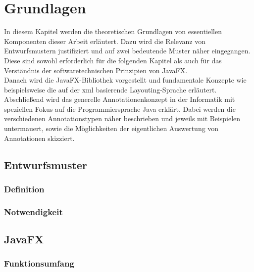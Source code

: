 \chapter{Grundlagen}
\label{grundlagen}
\noindent In diesem Kapitel werden die theoretischen Grundlagen von essentiellen Komponenten dieser Arbeit erläutert. Dazu wird die Relevanz von Entwurfsmustern justifiziert und auf zwei bedeutende Muster näher eingegangen. Diese sind sowohl erforderlich für die folgenden Kapitel als auch für das Verständnis der softwaretechnischen Prinzipien von JavaFX.\\
Danach wird die JavaFX-Bibliothek vorgestellt und fundamentale Konzepte wie beispielsweise die auf der \ac{xml} basierende Layouting-Sprache erläutert.\\
Abschließend wird das generelle Annotationenkonzept in der Informatik mit speziellen Fokus auf die Programmiersprache Java erklärt. Dabei werden die verschiedenen Annotationstypen näher beschrieben und jeweils mit Beispielen untermauert, sowie die Möglichkeiten der eigentlichen Auswertung von Annotationen skizziert.

\section{Entwurfsmuster}
\label{entwurfsmuster}


\subsection{Definition}
\label{entwurfsmuster_definition}


\subsection{Notwendigkeit}
\label{entwurfsmuster_notwendigkeit}


\section{JavaFX}
\label{javafx}

\subsection{Funktionsumfang}
\label{javafx_funktionsumfang}

